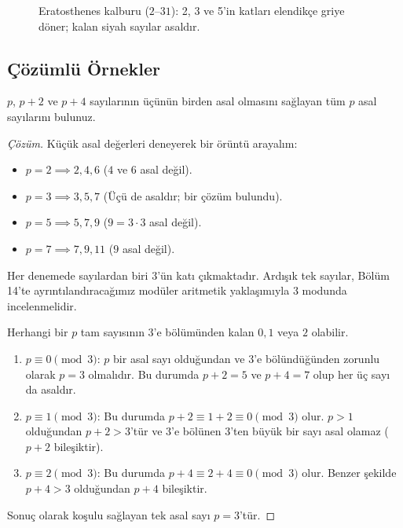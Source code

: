 \begin{figure}[ht]
\centering
{}
\caption{Eratosthenes kalburu ($2$--$31$): 2, 3 ve 5'in katları elendikçe griye
döner; kalan siyah sayılar asaldır.}
\end{figure}

\subsection{Çözümlü Örnekler}

\begin{example}
$p$, $p+2$ ve $p+4$ sayılarının üçünün birden asal olmasını sağlayan tüm $p$ asal sayılarını bulunuz.
\end{example}

\begin{proof}[Çözüm]
Küçük asal değerleri deneyerek bir örüntü arayalım:
\begin{itemize}
    \item $p = 2 \implies 2, 4, 6$ ($4$ ve $6$ asal değil).
    \item $p = 3 \implies 3, 5, 7$ (Üçü de asaldır; bir çözüm bulundu).
    \item $p = 5 \implies 5, 7, 9$ ($9 = 3 \cdot 3$ asal değil).
    \item $p = 7 \implies 7, 9, 11$ ($9$ asal değil).
\end{itemize}
Her denemede sayılardan biri $3$'ün katı çıkmaktadır. Ardışık tek sayılar, Bölüm 14'te ayrıntılandıracağımız modüler aritmetik yaklaşımıyla $3$ modunda incelenmelidir.

Herhangi bir $p$ tam sayısının $3$'e bölümünden kalan $0, 1$ veya $2$ olabilir.
\begin{enumerate}
    \item $p \equiv 0 \pmod 3$: $p$ bir asal sayı olduğundan ve $3$'e bölündüğünden zorunlu olarak $p = 3$ olmalıdır. Bu durumda $p+2 = 5$ ve $p+4 = 7$ olup her üç sayı da asaldır.
    \item $p \equiv 1 \pmod 3$: Bu durumda $p+2 \equiv 1 + 2 \equiv 0 \pmod 3$ olur. $p > 1$ olduğundan $p+2 > 3$'tür ve $3$'e bölünen $3$'ten büyük bir sayı asal olamaz ($p+2$ bileşiktir).
    \item $p \equiv 2 \pmod 3$: Bu durumda $p+4 \equiv 2 + 4 \equiv 0 \pmod 3$ olur. Benzer şekilde $p+4 > 3$ olduğundan $p+4$ bileşiktir.
\end{enumerate}
Sonuç olarak koşulu sağlayan tek asal sayı $p = 3$'tür.
\end{proof}

